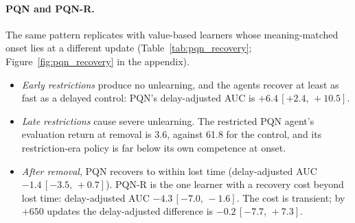 \documentclass[10pt]{article} %
\newcommand{\ci}[2]{\,[#1,\,#2]}
\begin{document}
\paragraph{PQN and PQN-R.}
The same pattern replicates with value-based learners whose meaning-matched onset lies at a different update (Table~\ref{tab:pqn_recovery}; Figure~\ref{fig:pqn_recovery} in the appendix).
\begin{itemize}
\item \emph{Early restrictions} produce no unlearning, and the agents recover at least as fast as a delayed control: PQN's delay-adjusted AUC is $+6.4\ci{+2.4}{+10.5}$.
\item \emph{Late restrictions} cause severe unlearning. The restricted PQN agent's evaluation return at removal is 3.6, against 61.8 for the control, and its restriction-era policy is far below its own competence at onset.
\item \emph{After removal}, PQN recovers to within lost time (delay-adjusted AUC $-1.4\ci{-3.5}{+0.7}$). PQN-R is the one learner with a recovery cost beyond lost time: delay-adjusted AUC $-4.3\ci{-7.0}{-1.6}$. The cost is transient; by $+650$ updates the delay-adjusted difference is $-0.2\ci{-7.7}{+7.3}$.
\end{itemize}
\end{document}
